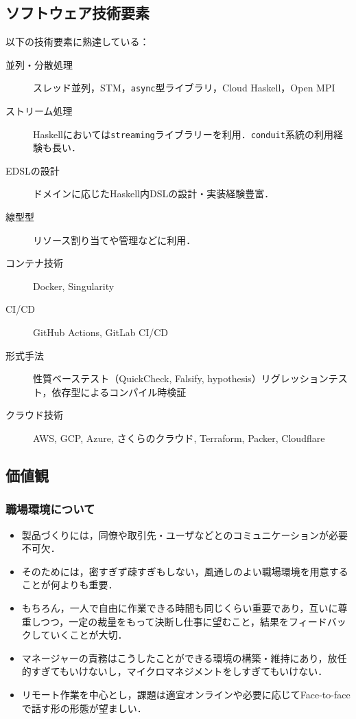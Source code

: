 \documentclass[a4j]{ltjsarticle}
\begin{document}
\subsection*{ソフトウェア技術要素}
以下の技術要素に熟達している：

\begin{description}
  \item[並列・分散処理] スレッド並列，STM，\texttt{async}型ライブラリ，Cloud Haskell，Open MPI
  \item[ストリーム処理] Haskellにおいては\texttt{streaming}ライブラリーを利用．\texttt{conduit}系統の利用経験も長い．
  \item[EDSLの設計] ドメインに応じたHaskell内DSLの設計・実装経験豊富．
  \item[線型型] リソース割り当てや管理などに利用．
  \item[コンテナ技術] Docker, Singularity
  \item[CI/CD] GitHub Actions, GitLab CI/CD
  \item[形式手法] 性質ベーステスト（QuickCheck, Falsify, hypothesis）リグレッションテスト，依存型によるコンパイル時検証
  \item[クラウド技術] AWS, GCP, Azure, さくらのクラウド, Terraform, Packer, Cloudflare
\end{description}

\subsection*{価値観}

\subsubsection*{職場環境について}
\begin{itemize}
  \item 製品づくりには，同僚や取引先・ユーザなどとのコミュニケーションが必要不可欠．
  \item そのためには，密すぎず疎すぎもしない，風通しのよい職場環境を用意することが何よりも重要．
  \item もちろん，一人で自由に作業できる時間も同じくらい重要であり，互いに尊重しつつ，一定の裁量をもって決断し仕事に望むこと，結果をフィードバックしていくことが大切．
  \item マネージャーの責務はこうしたことができる環境の構築・維持にあり，放任的すぎてもいけないし，マイクロマネジメントをしすぎてもいけない．
  \item リモート作業を中心とし，課題は適宜オンラインや必要に応じてFace-to-faceで話す形の形態が望ましい．
\end{itemize}
\end{document}
